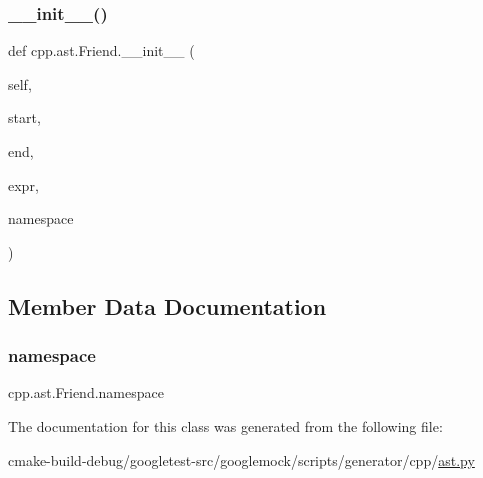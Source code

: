 \subsubsection{\texorpdfstring{\_\_init\_\_()}{\_\_init\_\_()}}
{\footnotesize\ttfamily def cpp.\+ast.\+Friend.\+\_\+\+\_\+init\+\_\+\+\_\+ (\begin{DoxyParamCaption}\item[{}]{self,  }\item[{}]{start,  }\item[{}]{end,  }\item[{}]{expr,  }\item[{}]{namespace }\end{DoxyParamCaption})}



\subsection{Member Data Documentation}
\mbox{\label{classcpp_1_1ast_1_1Friend_a076c68dddae9bd1e24d224d005538014}} 
\subsubsection{\texorpdfstring{namespace}{namespace}}
{\footnotesize\ttfamily cpp.\+ast.\+Friend.\+namespace}



The documentation for this class was generated from the following file\+:\begin{DoxyCompactItemize}
\item 
cmake-\/build-\/debug/googletest-\/src/googlemock/scripts/generator/cpp/\mbox{\hyperlink{ast_8py}{ast.\+py}}\end{DoxyCompactItemize}
